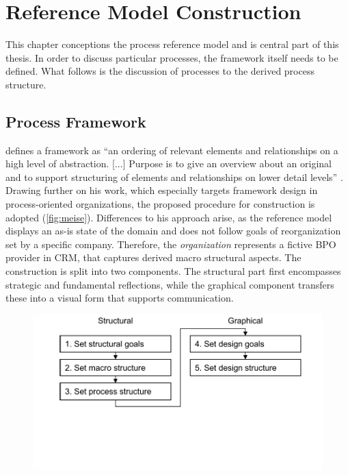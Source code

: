 
\chapter{Reference Model Construction}
\label{chap:refmod}
This chapter conceptions the process reference model and is central part of this thesis. In order to discuss particular processes, the framework itself needs to be defined. What follows is the discussion of processes \wrt to the derived process structure.


	\section{Process Framework}
	
	\citeauthor{Meise2001} defines a framework as \enquote{an ordering of relevant elements and relationships on a high level of abstraction. [...] Purpose is to give an overview about an original and to support structuring of elements and relationships on lower detail levels} \citep[]{Meise2001}. Drawing further on his work, which especially targets framework design in process-oriented organizations, the proposed procedure for construction is adopted (\Fig \ref{fig:meise}). Differences to his approach arise, as the reference model displays an as-is state of the domain and does not follow goals of reorganization set by a specific company. Therefore, the \textit{organization} represents a fictive BPO provider in CRM, that captures derived macro structural aspects. The construction is split into two components. The structural part first encompasses strategic and fundamental reflections, while the graphical component transfers these into a visual form that supports communication.

	\begin{figure}[caption={Procedure for Framework Construction}, label={fig:meise}]
		{	\includegraphics[width=.8\textwidth]{figures/framework-meise.pdf}}
		\parbox{0.7\textwidth }{}
	\end{figure} 
	
